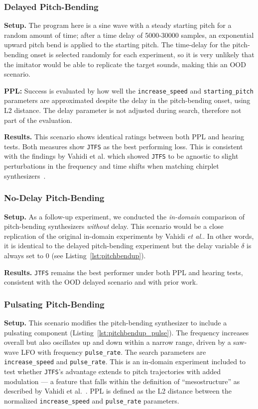 \documentclass[10pt]{article} %
\newcommand{\JTFS}{\texttt{JTFS}\xspace}
\begin{document}
\subsubsection{Delayed Pitch-Bending}
\label{sec:delayed_chirplet}
\textbf{Setup.} The program here is a sine wave with a steady starting pitch for a random amount of time; after a time delay of 5000-30000 samples, an exponential upward pitch bend is applied to the starting pitch. The time-delay for the pitch-bending onset is selected randomly for each experiment, so it is very unlikely that the imitator would be able to replicate the target sounds, making this an OOD scenario. 

\noindent \textbf{PPL:} Success is evaluated by how well the \texttt{increase\_speed} and \texttt{starting\_pitch} parameters are approximated despite the delay in the pitch-bending onset, using L2 distance. The delay parameter is not adjusted during search, therefore not part of the evaluation.

\noindent \textbf{Results.} This scenario shows identical ratings between both PPL and hearing tests. Both measures show \JTFS as the best performing loss. This is consistent with the findings by Vahidi et al. which showed \JTFS to be agnostic to slight perturbations in the frequency and time shifts when matching chirplet synthesizers~\cite{vahidi2023mesostructures}. 

\subsubsection{No-Delay Pitch-Bending}
\label{sec:no_delayed_chirplet}
\textbf{Setup.} As a follow-up experiment, we conducted the \textit{in-domain} comparison of pitch-bending synthesizers \textit{without} delay. This scenario would be a close replication of the original in-domain experiments by Vahidi \textit{et al.}. In other words, it is identical to the delayed pitch-bending experiment but the delay variable $\delta$ is always set to 0 (see Listing~\ref{lst:pitchbendup}).  

\noindent \textbf{Results.} \JTFS remains the best performer under both PPL and hearing tests, consistent with the OOD delayed scenario and with prior work. 

\subsubsection{Pulsating Pitch-Bending}
\label{sec:pulsating_chirplet}
\textbf{Setup.} This scenario modifies the pitch-bending synthesizer to include a pulsating component (Listing~\ref{lst:pitchbendup_pulse}). The frequency increases overall but also oscillates up and down within a narrow range, driven by a saw-wave LFO with frequency \texttt{pulse\_rate}. The search parameters are \texttt{increase\_speed} and \texttt{pulse\_rate}. This is an in-domain experiment included to test whether \JTFS's advantage extends to pitch trajectories with added modulation --- a feature that falls within the definition of ``mesostructure'' as described by Vahidi et al.~\cite{vahidi2023mesostructures}. PPL is defined as the L2 distance between the normalized \texttt{increase\_speed} and \texttt{pulse\_rate} parameters.
\end{document}

